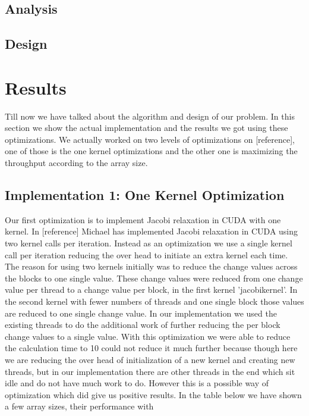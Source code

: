 \documentclass[11pt, twocolumn]{article}
\begin{document}
    \subsection{Analysis} %
    \subsection{Design} %

\section{Results} %
Till now we have talked about the algorithm and design of our problem. In this section we show the
actual implementation and the results we got using these optimizations. We actually worked on two
levels of optimizations on [reference], one of those is the one kernel optimizations and the other one is
maximizing the throughput according to the array size.
    \subsection{Implementation 1: One Kernel Optimization}
    Our first optimization is to implement Jacobi relaxation in CUDA with one kernel. In [reference]
    Michael has implemented Jacobi relaxation in CUDA using two kernel calls per iteration. Instead as an
    optimization we use a single kernel call per iteration reducing the over head to initiate an extra kernel
    each time. The reason for using two kernels initially was to reduce the change values across the blocks
    to one single value. These change values were reduced from one change value per thread to a change
    value per block, in the first kernel 'jacobikernel'. In the second kernel with fewer numbers of threads
    and one single block those values are reduced to one single change value. In our implementation we
    used the existing threads to do the additional work of further reducing the per block change values to
    a single value. With this optimization we were able to reduce the calculation time to 10%
    could not reduce it much further because though here we are reducing the over head of initialization of
    a new kernel and creating new threads, but in our implementation there are other threads in the end
    which sit idle and do not have much work to do. However this is a possible way of optimization which
    did give us positive results. In the table below we have shown a few array sizes, their performance with
\end{document}
